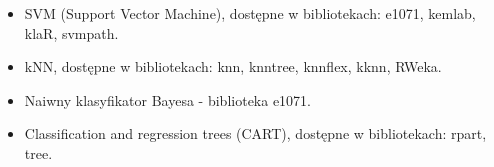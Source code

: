 \documentclass[a4paper,12pt]{article}
\begin{document}
  \begin{itemize}
  \item SVM (Support Vector Machine), dostępne w bibliotekach: e1071, kemlab, klaR, svmpath.
  \item kNN, dostępne w bibliotekach: knn, knntree, knnflex, kknn, RWeka.
  \item Naiwny klasyfikator Bayesa - biblioteka e1071.
  \item Classification and regression trees (CART), dostępne w bibliotekach: rpart, tree.
  \end{itemize}
\end{document}
